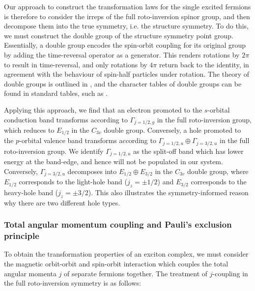 Our approach to construct the transformation laws for the single excited fermions is therefore to consider the irreps of the full roto-inversion spinor group, and then decompose them into the true symmetry, i.e. the structure symmetry. To do this, we must construct the double group of the structure symmetry point group. Essentially, a double group encodes the spin-orbit coupling for its original group by adding the time-reversal operator as a generator. This renders rotations by $2\pi$ to result in time-reversal, and only rotations by $4\pi$ return back to the identity, in agreement with the behaviour of spin-half particles under rotation. The theory of double groups is outlined in \cite[Ch. 19]{dresselhaus}, and the character tables of double groups can be found in standard tables, such as \cite{altmann}.

Applying this approach, we find that an electron promoted to the $s$-orbital conduction band transforms according to $\Gamma_{j=1/2, g}$ in the full roto-inversion group, which reduces to $E_{1/2}$ in the $C_{3v}$ double group. Conversely, a hole promoted to the $p$-orbital valence band transforms according to $\Gamma_{j=1/2, u}\oplus\Gamma_{j=3/2, u}$ in the full roto-inversion group. We identify $\Gamma_{j=1/2, u}$ as the split-off band which has lower energy at the band-edge, and hence will not be populated in our system. Conversely, $\Gamma_{j=3/2, u}$ decomposes into $E_{1/2}\oplus E_{3/2}$ in the $C_{3v}$ double group, where $E_{1/2}$ corresponds to the light-hole band ($j_z=\pm 1/2$) and $E_{3/2}$ corresponds to the heavy-hole band ($j_z=\pm 3/2$). This also illustrates the symmetry-informed reason why there are two different hole types.

\subsubsection{Total angular momentum coupling and Pauli's exclusion principle} \label{sec:j_coupling}
To obtain the transformation properties of an exciton complex, we must consider the magnetic orbit-orbit and spin-orbit interaction which couples the total angular momenta $j$ of separate fermions together. The treatment of $j$-coupling in the full roto-inversion symmetry is as follows:

